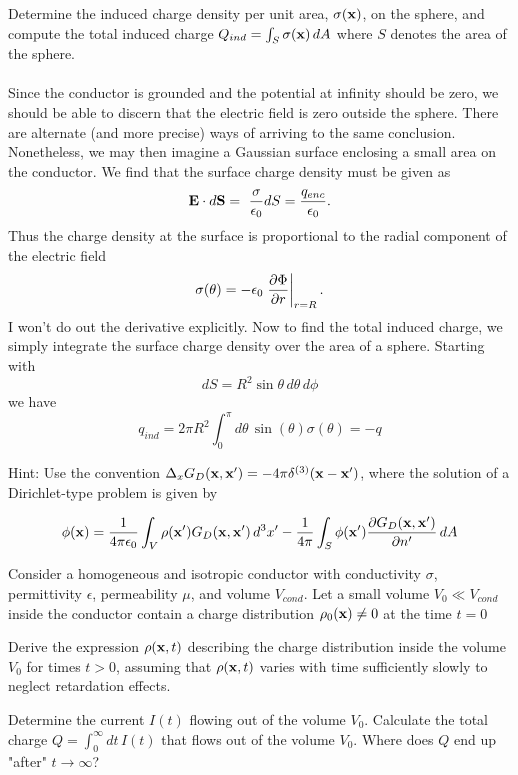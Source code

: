 \documentclass[11pt,letterpaper]{article}
\begin{document}
				
			\item
			Determine the induced charge density per unit area, $\sigma(\vect x)$, on the sphere, and compute the total induced
			charge $Q_{ind} = \int_S\sigma(\vect x)\, dA$ where $S$ denotes the area of the sphere.
			\\
			\\
			Since the conductor is grounded and the potential at infinity should be zero, we should be able to discern that 
			the electric field is zero outside the sphere. There are alternate (and more precise) ways of arriving to the same conclusion. 
			Nonetheless, we may then imagine a Gaussian surface enclosing a small area on the conductor. We find that the 
			surface charge density must be given as
			\[
				\vect E\cdot d\vect S = \ \frac{\sigma}{\epsilon_0}dS = \frac{q_{enc}}{\epo}.
			\]
			Thus the charge density at the surface is proportional to the radial component of the electric field
			\[
				\sigma(\theta) = -\epo\elr{\pdiff[\Phi]{r}}_{r=R}.
			\]
			I won't do out the derivative explicitly. Now to find the total induced charge, we simply integrate the surface charge density
			over the area of a sphere. Starting with
			\[	
				dS = R^2\sin\theta\, d\theta\, d\phi
			\]
			we have
			\[	
				q_{ind} = 2\pi R^2 \int_0^\pi d\theta\, \sin(\theta) \sigma(\theta) = -q
			\]
			\eenum
			
			Hint: Use the convention $\Delta_xG_D(\vect x,\vect x') = -4\pi\delta^{(3)}(\vect x-\vect x')$, where the solution of a 
			Dirichlet-type problem is given by 
			
			\[
				\phi(\vect x) = \frac{1}{4\pi\epo}\int_V\rho(\vect x')G_D(\vect x,\vect x')\, d^3x' 
				- \frac{1}{4\pi}\int_S\phi(\vect x')\pdiff[G_D(\vect x,\vect x')]{n'}\,dA
			\]
		\item
		Consider a homogeneous and isotropic conductor with conductivity $\sigma$, permittivity $\epsilon$, permeability $\mu$,
		and volume $V_{cond}$. Let a small volume $V_0 \ll V_{cond}$ inside the conductor contain a charge distribution 
		$\rho_0(\vect x)\ne 0$ at the time $t=0$
		\\
		\benum
			\item
			Derive the expression $\rho(\vect x,t)$ describing the charge distribution inside the volume $V_0$ for times $t>0$,
			assuming that $\rho(\vect x,t)$ varies with time sufficiently slowly to neglect retardation effects.
			\\
			
			\item
			Determine the current $I(t)$ flowing out of the volume $V_0$. Calculate the total charge 
			$Q = \int_0^\infty dt\, I(t) $ that flows out of the volume $V_0$. Where does $Q$ end up "after" $t\to\infty$?
			\\
			
\end{document}
